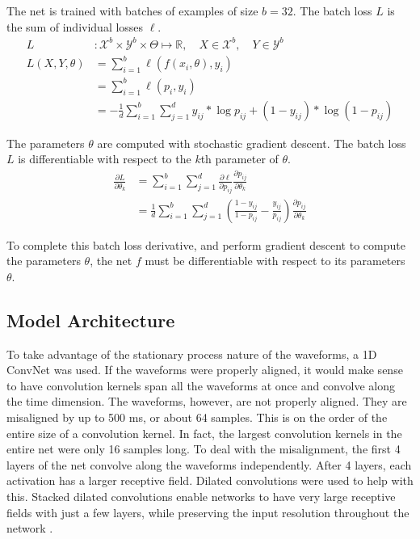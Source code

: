 The net is trained with batches of examples of size $b = 32$.  The batch loss $L$ is the sum of individual losses $\ell$.
\begin{align}
    L &: \mathcal{X}^b \times \mathcal{Y}^b 
        \times \Theta \mapsto \mathbb{R}, \quad
        X \in \mathcal{X}^b, \quad 
        Y \in \mathcal{Y}^b \\
    L(X, Y, \theta) 
        &= \sum_{i=1}^b \ell(f(x_i, \theta), y_i) \\
        &= \sum_{i=1}^b \ell(p_i, y_i) \\
        &= -\frac{1}{d} \sum_{i=1}^b \sum_{j=1}^d 
            y_{ij} * \log p_{ij} + (1 - y_{ij}) * \log(1 - p_{ij})
\end{align}

The parameters $\theta$ are computed with stochastic gradient descent.  The batch loss $L$ is differentiable with respect to the $k$th parameter of $\theta$.
\begin{align}
    \frac{\partial L}{\partial \theta_k} 
        &= \sum_{i=1}^b \sum_{j=1}^d 
            \frac{\partial \ell}{\partial p_{ij}}  
            \frac{\partial p_{ij}}{\partial \theta_k} \\
        &= \frac{1}{d} \sum_{i=1}^b \sum_{j=1}^d
            \left(
                \frac{1 - y_{ij}}{1 - p_{ij}} - \frac{y_{ij}}{p_{ij}}
            \right)
            \frac{\partial p_{ij}}{\partial \theta_k}
\end{align}



To complete this batch loss derivative, and perform gradient descent to compute the parameters $\theta$, the net $f$ must be differentiable with respect to its parameters $\theta$.

\subsection{Model Architecture}

To take advantage of the stationary process nature of the waveforms, a 1D ConvNet was used.  If the waveforms were properly aligned, it would make sense to have convolution kernels span all the waveforms at once and convolve along the time dimension.  The waveforms, however, are not properly aligned.  They are misaligned by up to 500 ms, or about 64 samples.  This is on the order of the entire size of a convolution kernel.  In fact, the largest convolution kernels in the entire net were only 16 samples long.  To deal with the misalignment, the first 4 layers of the net convolve along the waveforms independently.  After 4 layers, each activation has a larger receptive field.  Dilated convolutions were used to help with this.  Stacked dilated convolutions enable networks to have very large receptive fields with just a few layers, while preserving the input resolution throughout the network \cite{oord2016wavenet}.  

